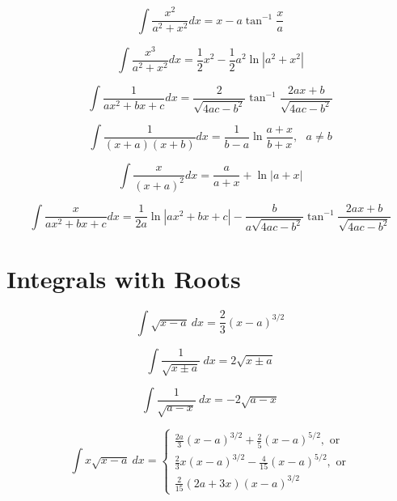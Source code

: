 \begin{equation}
\int \frac{x^2}{a^2+x^2}dx = x-a\tan^{-1}\frac{x}{a}
\end{equation}

\begin{equation}
\int \frac{x^3}{a^2+x^2}dx = \frac{1}{2}x^2-\frac{1}{2}a^2\ln|a^2+x^2|
\end{equation}

\begin{equation}
\int \frac{1}{ax^2+bx+c}dx = \frac{2}{\sqrt{4ac-b^2}}\tan^{-1}\frac{2ax+b}{\sqrt{4ac-b^2}}
\end{equation}

\begin{equation}
\int \frac{1}{(x+a)(x+b)}dx = \frac{1}{b-a}\ln\frac{a+x}{b+x}, \text{ } a\ne b
\end{equation}

\begin{equation}
\int \frac{x}{(x+a)^2}dx = \frac{a}{a+x}+\ln |a+x|
\end{equation}


\begin{equation}
\int \frac{x}{ax^2+bx+c}dx = \frac{1}{2a}\ln|ax^2+bx+c| 
-\frac{b}{a\sqrt{4ac-b^2}}\tan^{-1}\frac{2ax+b}{\sqrt{4ac-b^2}}
\end{equation}

\section*{Integrals with Roots}

\begin{equation}
\int \sqrt{x-a}\ dx = \frac{2}{3}(x-a)^{3/2}
\end{equation}



\begin{equation}
\int \frac{1}{\sqrt{x\pm a}}\ dx = 2\sqrt{x\pm a} 
\end{equation}

\begin{equation}\label{eq:Rigo}
\int \frac{1}{\sqrt{a-x}}\ dx = -2\sqrt{a-x} 
\end{equation}


\begin{equation}\label{eq:Gilmore}
\int x\sqrt{x-a}\ dx =  
\left\{
\begin{array}{l}
\frac{2 a}{3} \left({x-a}\right)^{3/2} +\frac{2 }{5}\left( {x-a}\right)^{5/2},\text{ or} 
\\ \frac{2}{3} x(x-a)^{3/2} - \frac{4}{15} (x-a)^{5/2}, \text{ or}
\\ \frac{2}{15}(2a+3x)(x-a)^{3/2}
\end{array}
\right.
\end{equation}

